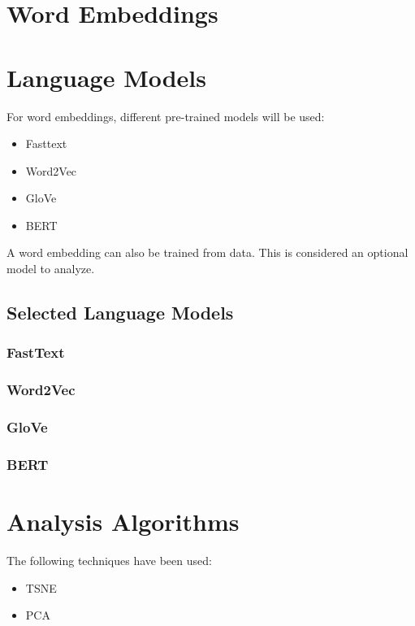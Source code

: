 \section{Word Embeddings}\label{sec:Word Embeddings}


\section{Language Models}\label{sec:Language Models}
For word embeddings, different pre-trained models will be used:
\begin{itemize}
  \item Fasttext
  \item Word2Vec
  \item GloVe
  \item BERT
\end{itemize}
A word embedding can also be trained from data. This is considered an optional model to analyze. %

\subsection{Selected Language Models}\label{sub:Selected Language Models}

\subsubsection{FastText}\label{subs:FastText}
\subsubsection{Word2Vec}\label{subs:Word2Vec}
\subsubsection{GloVe}\label{subs:GloVe}
\subsubsection{BERT}\label{subs:BERT}

\section{Analysis Algorithms}\label{sec:Analysis Algorithms}
The following techniques have been used:
\begin{itemize}
  \item TSNE
  \item PCA
\end{itemize}

